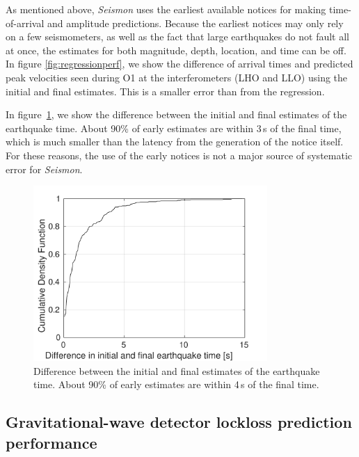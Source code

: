 \documentclass[reprint, prl, aps, showpacs]{revtex4-1}
\begin{document}
As mentioned above, \emph{Seismon} uses the earliest available notices for making time-of-arrival and amplitude predictions. Because the earliest notices may only rely on a few seismometers, as well as the fact that large earthquakes do not fault all at once, the estimates for both magnitude, depth, location, and time can be off. In figure \ref{fig:regressionperf}, we show the difference of arrival times and predicted peak velocities seen during O1 at the interferometers (LHO and LLO) using the initial and final estimates. This is a smaller error than from the regression. 

In figure~\ref{fig:initialvsfinal}, we show the difference between the initial and final estimates of the earthquake time. About 90\% of early estimates are within 3\,s of the final time, which is much smaller than the latency from the generation of the notice itself.
For these reasons, the use of the early notices is not a major source of systematic error for \emph{Seismon}.

\begin{figure}[t]
\hspace*{-0.5cm}
 \includegraphics[width=3.5in]{lockloss_est_timediff.pdf}
 \caption{Difference between the initial and final estimates of the earthquake time. About 90\% of early estimates are within 4\,s of the final time.}
 \label{fig:initialvsfinal}
\end{figure}

\subsection{Gravitational-wave detector lockloss prediction performance}
\end{document}
